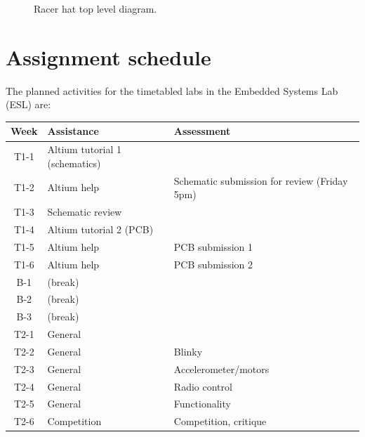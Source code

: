 \documentclass[11pt, a4paper]{article}
\begin{document}

\begin{figure}[h]
  \centering
  
  \caption{Racer hat top level diagram.}
\end{figure}


\vfill\pagebreak

\section{Assignment schedule}

The planned activities for the timetabled labs in the Embedded Systems
Lab (ESL) are:
%
\begin{flushleft}
  \begin{tabular}{ c l l }
    Week            &  Assistance  &  Assessment \\
    \hline \hline
    T1-1 & Altium tutorial 1 (schematics)  & \\
    T1-2 & Altium help      & Schematic submission for review (Friday 5pm) \\
    T1-3 & Schematic review & \\
    T1-4 & Altium tutorial 2 (PCB) &          \\
    T1-5 & Altium help      & PCB submission 1    \\
    T1-6 & Altium help      & PCB submission 2    \\
    \hline
    B-1  & (break)          &                   \\
    B-2  & (break)          &                   \\
    B-3  & (break)          &                   \\
    \hline
    T2-1 & General          &                   \\
    T2-2 & General          & Blinky            \\
    T2-3 & General          & Accelerometer/motors        \\
    T2-4 & General          & Radio control     \\
    T2-5 & General          & Functionality     \\
    T2-6 & Competition      & Competition, critique  \\
  \end{tabular}
\end{flushleft}
\end{document}
